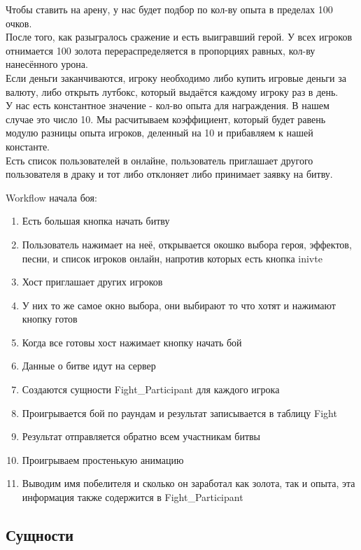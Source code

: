 Чтобы ставить на арену, у нас будет подбор по кол-ву опыта в пределах 100 очков.\\
    
После того, как разыгралось сражение и есть выигравший герой. У всех игроков отнимается 100 золота перераспределяется в пропорциях равных, кол-ву нанесённого урона. \\

Если деньги заканчиваются, игроку необходимо либо купить игровые деньги за валюту, либо открыть лутбокс, который выдаётся каждому игроку раз в день. \\

У нас есть константное значение - кол-во опыта для награждения. В нашем случае это число 10. Мы расчитываем коэффициент, который будет равень модулю разницы опыта игроков, деленный на 10 и прибавляем к нашей константе.\\

Есть список пользователей в онлайне, пользователь приглашает другого пользователя в драку и тот либо отклоняет либо принимает заявку на битву.

Workflow начала боя:
\begin{enumerate}
    \item Есть большая кнопка начать битву
    \item Пользователь нажимает на неё, открывается окошко выбора героя, эффектов, песни, и список игроков онлайн, напротив которых есть кнопка inivte
    \item Хост приглашает других игроков
    \item У них то же самое окно выбора, они выбирают то что хотят и нажимают кнопку готов
    \item Когда все готовы хост нажимает кнопку начать бой
    \item Данные о битве идут на сервер
    \item Создаются сущности Fight\_Participant для каждого игрока
    \item Проигрывается бой по раундам и результат записывается в таблицу Fight
    \item Результат отправляется обратно всем участникам битвы
    \item Проигрываем простенькую анимацию
    \item Выводим имя побелителя и сколько он заработал как золота, так и опыта, эта информация также содержится в Fight\_Participant
\end{enumerate}


\subsection*{Сущности}

